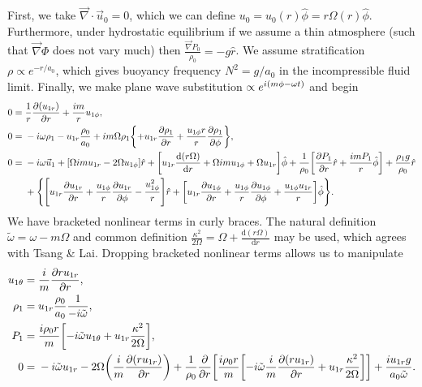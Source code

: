 \documentclass[11pt,
        usenames, %
        dvipsnames %
    ]{report}
\newcommand*{\rd}[2]{\frac{\mathrm{d}#1}{\mathrm{d}#2}}
\newcommand*{\pd}[2]{\frac{\partial#1}{\partial#2}}
\DeclarePairedDelimiter\p{\lparen}{\rparen}
\DeclarePairedDelimiter\s{\lbrack}{\rbrack}
\DeclarePairedDelimiter\z{\lbrace}{\rbrace}
\begin{document}
First, we take $\vec{\nabla} \cdot \vec{u}_0 = 0$, which we can define $u_0 =
u_0(r)\hat{\phi} = r\Omega(r) \hat{\phi}$. Furthermore, under hydrostatic
equilibrium if we assume a thin atmosphere (such that $\vec{\nabla}\Phi$ does
not vary much) then $\frac{\vec{\nabla}P_0}{\rho_0} = -g\hat{r}$. We assume
stratification $\rho \propto e^{-r/a_0}$, which gives buoyancy frequency $N^2 =
g/a_0$ in the incompressible fluid limit. Finally, we make plane wave
substitution $\propto e^{i\p*{m\phi - \omega t}}$ and begin
\begin{align}
    0 ={}& \frac{1}{r}\pd{\p*{u_{1r}}}{r} + \frac{im}{r}u_{1\phi},\\
    0 ={}& -i\omega \rho_1 - u_{1r}\frac{\rho_0}{a_0} + im\Omega\rho_1
        \z*{+ u_{1r}\pd{\rho_1}{r} + \frac{u_{1\phi}r}{r}\pd{\rho_1}{\phi}}
            ,\\
    0 ={}& -i\omega \vec{u}_1
            + \s*{\Omega im u_{1r} - 2\Omega u_{1\phi}} \hat{r}
            +\s*{u_{1r}\rd{\p*{r\Omega}}{r} + \Omega imu_{1\phi}
                + \Omega u_{1r}}\hat{\phi}
            + \frac{1}{\rho_0}\s*{\pd{P_1}{r}\hat{r} + \frac{imP_1}{r}
                \hat{\phi}} + \frac{\rho_1 g}{\rho_0}\hat{r}\nonumber\\
        &+ \z*{\s*{u_{1r}\pd{u_{1r}}{r} + \frac{u_{1\phi}}{r}
            \pd{u_{1r}}{\phi} - \frac{u_{1\phi}^2}{r}}\hat{r}
            + \s*{u_{1r}\pd{u_{1\phi}}{r}
                + \frac{u_{1\phi}}{r}\pd{u_{1\phi}}{\phi}
                + \frac{u_{1\phi} u_{1r}}{r}}\hat{\phi}}.
\end{align}
We have bracketed nonlinear terms in curly braces. The natural definition
$\tilde{\omega} = \omega - m\Omega$ and common definition $\frac{\kappa^2}{2\Omega}
= \Omega + \rd{(r\Omega)}{r}$ may be used, which agrees with Tsang \& Lai.
Dropping bracketed nonlinear terms allows us to manipulate
\begin{align}
    u_{1\theta} ={}& \frac{i}{m} \pd{ru_{1r}}{r},\\
    \rho_1 ={}& u_{1r}\frac{\rho_0}{a_0}\frac{1}{-i\tilde{\omega}},\\
    P_1 ={}& \frac{i\rho_0 r}{m}\s*{-i\tilde{\omega}u_{1\theta}
        + u_{1r}\frac{\kappa^2}{2\Omega}},\\
    0 ={}& -i\tilde{\omega}u_{1r} - 2\Omega\p*{\frac{i}{m}\pd{(ru_{1r})}{r}}
        + \frac{1}{\rho_0}\pd{}{r}\s*{\frac{i\rho_0 r}{m}\s*{
            -i\tilde{\omega} \frac{i}{m}\pd{(ru_{1r})}{r}
            +u_{1r}\frac{\kappa^2}{2\Omega}}}
        + \frac{iu_{1r}g}{a_0\tilde{\omega}}.
\end{align}
\end{document}
